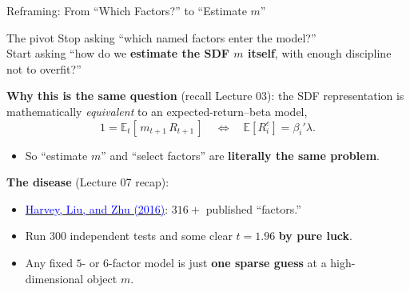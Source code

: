 \documentclass{beamer}
\newcommand{\E}{\mathbb{E}}
\begin{document}
\begin{frame}{Reframing: From ``Which Factors?'' to ``Estimate $m$''}
\begin{block}{The pivot}
Stop asking \alert{``which named factors enter the model?''}\\
Start asking \alert{``how do we \textbf{estimate the SDF $m$ itself}, with enough discipline not to overfit?''}
\end{block}
\textbf{Why this is the same question} (recall Lecture 03): the SDF representation is mathematically \textit{equivalent} to an expected-return--beta model,
\begin{equation*}
1 = \E_t[\,m_{t+1}\, R_{t+1}\,]
\quad\Longleftrightarrow\quad
\E[R^e_i] = \beta_i'\lambda .
\end{equation*}
\begin{itemize}
\item So \alert{``estimate $m$''} and \alert{``select factors''} are \textbf{literally the same problem}.
\end{itemize}
\textbf{The disease} (Lecture 07 recap):
\begin{itemize}
\item \href{https://doi.org/10.1093/rfs/hhv059}{\textcolor{blue}{Harvey, Liu, and Zhu (2016)}}: $316{+}$ published ``factors.''
\item Run $300$ independent tests and some clear $t=1.96$ \textbf{by pure luck}.
\item Any fixed $5$- or $6$-factor model is just \textbf{one sparse guess} at a high-dimensional object $m$.
\end{itemize}
\end{frame}
\end{document}
